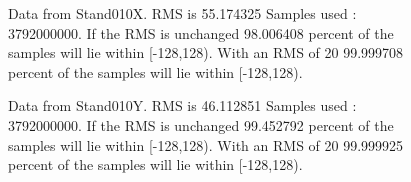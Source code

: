 \begin{figure}[ht] 				 				 				\caption{Data from Stand010X. RMS is 55.174325 Samples used : 3792000000. If the RMS is unchanged 98.006408 percent of the samples will lie within [-128,128).  				 With an RMS of 20 99.999708 percent of the samples will lie within [-128,128).} 				\end{figure} 

\begin{figure}[ht] 				 				 				\caption{Data from Stand010Y. RMS is 46.112851 Samples used : 3792000000. If the RMS is unchanged 99.452792 percent of the samples will lie within [-128,128).  				 With an RMS of 20 99.999925 percent of the samples will lie within [-128,128).} 				\end{figure} 

